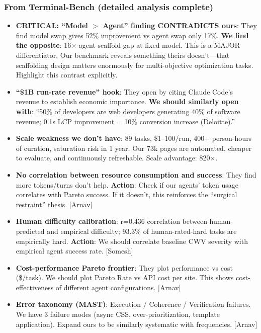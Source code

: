 \subsubsection{From Terminal-Bench (detailed analysis complete)}
\begin{itemize}
    \item \textbf{CRITICAL: ``Model $>$ Agent'' finding CONTRADICTS ours}: They find model swap gives 52\% improvement vs agent swap only 17\%. \textbf{We find the opposite}: 16$\times$ agent scaffold gap at fixed model. This is a MAJOR differentiator. Our benchmark reveals something theirs doesn't---that scaffolding design matters enormously for multi-objective optimization tasks. Highlight this contrast explicitly.
    \item \textbf{``\$1B run-rate revenue'' hook}: They open by citing Claude Code's revenue to establish economic importance. \textbf{We should similarly open with}: ``50\% of developers are web developers generating 40\% of software revenue; 0.1s LCP improvement = 10\% conversion increase (Deloitte).''
    \item \textbf{Scale weakness we don't have}: 89 tasks, \$1--100/run, 400+ person-hours of curation, saturation risk in 1 year. Our 73k pages are automated, cheaper to evaluate, and continuously refreshable. Scale advantage: 820$\times$.
    \item \textbf{No correlation between resource consumption and success}: They find more tokens/turns don't help. \textbf{Action}: Check if our agents' token usage correlates with Pareto success. If it doesn't, this reinforces the ``surgical restraint'' thesis. [Arnav]
    \item \textbf{Human difficulty calibration}: r=0.436 correlation between human-predicted and empirical difficulty; 93.3\% of human-rated-hard tasks are empirically hard. \textbf{Action}: We should correlate baseline CWV severity with empirical agent success rate. [Somesh]
    \item \textbf{Cost-performance Pareto frontier}: They plot performance vs cost (\$/task). We should plot Pareto Rate vs API cost per site. This shows cost-effectiveness of different agent configurations. [Arnav]
    \item \textbf{Error taxonomy (MAST)}: Execution / Coherence / Verification failures. We have 3 failure modes (async CSS, over-prioritization, template application). Expand ours to be similarly systematic with frequencies. [Arnav]
\end{itemize}

